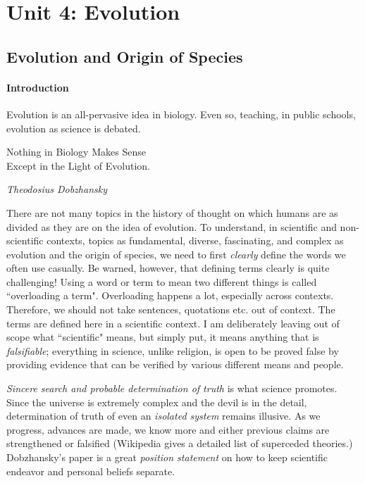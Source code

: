 \documentclass[12pt]{article}
\begin{document}
\section{Unit 4: Evolution}
\subsection{Evolution and Origin of Species}
\paragraph{Introduction}
Evolution is an all-pervasive idea in biology. Even so, teaching, in public schools, evolution as science is debated. 
\epigraph{
    Nothing in Biology Makes Sense \\
    Except in the Light of Evolution.
}{
    \textit{Theodosius Dobzhansky \cite{light-of-evol}}
}
\par\bigskip
There are not many topics in the history of thought on which humans are as divided as they are on the idea of evolution. To understand, in scientific and non-scientific contexts, topics as fundamental, diverse, fascinating, and complex as evolution and the origin of species, we need to first \emph{clearly} define the words we often use casually. Be warned, however, that defining terms clearly is quite challenging! Using a word or term to mean two different things is called ``overloading a term". Overloading happens a lot, especially across contexts. Therefore, we should not take sentences, quotations etc. out of context. The terms are defined here in a scientific context. I am deliberately leaving out of scope what ``scientific" means, but simply put, it means anything that is \emph{falsifiable}; everything in science, unlike religion, is open to be proved false by providing evidence that can be verified by various different means and people.
\par\bigskip

\emph{Sincere search and probable determination of truth} is what science promotes. Since the universe is extremely complex and the devil is in the detail, determination of truth of even an \emph{isolated system} remains illusive. As we progress, advances are made, we know more and either previous claims are strengthened or falsified (Wikipedia \cite{superseded} gives a detailed list of superceded theories.) Dobzhansky's paper \cite{light-of-evol} is a great \emph{position statement} on how to keep scientific endeavor and personal beliefs separate.
\par\bigskip
\end{document}
